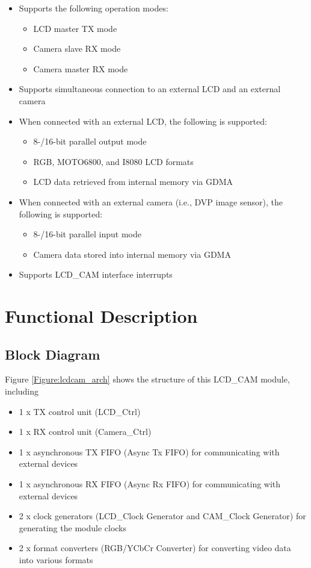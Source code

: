 \documentclass[main\_\_EN.tex]{subfiles}
\begin{document}
\begin{itemize}
    \item Supports the following operation modes:
    \begin{itemize}
        \item LCD master TX mode
        \item Camera slave RX mode
        \item Camera master RX mode
    \end{itemize}
    \item Supports simultaneous connection to an external LCD and an external camera
    \item When connected with an external LCD, the following is supported:
    \begin{itemize}
        \item 8-/16-bit parallel output mode
        \item RGB, MOTO6800, and I8080 LCD formats
        \item LCD data retrieved from internal memory via GDMA
    \end{itemize}
    \item When connected with an external camera (i.e., DVP image sensor), the following is supported:
    \begin{itemize}
        \item 8-/16-bit parallel input mode
        \item Camera data stored into internal memory via GDMA
    \end{itemize}
    \item Supports LCD\_CAM interface interrupts
\end{itemize}



\section{Functional Description}

\subsection{Block Diagram}
Figure  \ref{Figure:lcdcam_arch} shows the structure of this LCD\_CAM module, including
\begin{itemize}
    \item 1 x TX control unit (LCD\_Ctrl)
    \item 1 x RX control unit (Camera\_Ctrl)
    \item 1 x asynchronous TX FIFO (Async Tx FIFO) for communicating with external devices
    \item 1 x asynchronous RX FIFO (Async Rx FIFO) for communicating with external devices
    \item 2 x clock generators (LCD\_Clock Generator and CAM\_Clock Generator) for generating the module clocks
    \item 2 x format converters (RGB/YCbCr Converter) for converting video data into various formats
\end{itemize}
\end{document}
